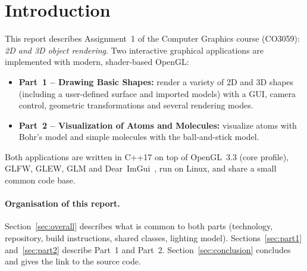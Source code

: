 \documentclass[a4paper, 11pt]{article}
\begin{document}
\pagebreak
{\setlength{\parskip}{0pt}\tableofcontents}
\pagebreak

\section{Introduction}

This report describes Assignment~1 of the Computer Graphics course (CO3059): \emph{2D and 3D object rendering}. Two interactive graphical applications are implemented with modern, shader-based OpenGL:
\begin{itemize}
  \item \textbf{Part~1 -- Drawing Basic Shapes:} render a variety of 2D and 3D shapes (including a user-defined surface and imported models)
        with a GUI, camera control, geometric transformations and several rendering modes.
  \item \textbf{Part~2 -- Visualization of Atoms and Molecules:} visualize atoms with Bohr's model and simple molecules with the ball-and-stick model.
\end{itemize}
Both applications are written in C++17 on top of OpenGL~3.3 (core profile), GLFW, GLEW, GLM and Dear~ImGui~\cite{opengl33,glfw,glew,glm,imgui}, run on Linux, and share a small common code base.

\paragraph{Organisation of this report.} Section~\ref{sec:overall} describes what is common to both parts (technology, repository, build instructions,
shared classes, lighting model). Sections~\ref{sec:part1} and~\ref{sec:part2} describe Part~1 and Part~2. Section~\ref{sec:conclusion} concludes and gives the link to the source code.

\end{document}

